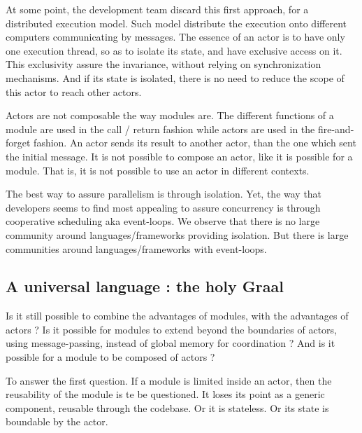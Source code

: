 At some point, the development team discard this first approach, for a distributed execution model.
Such model distribute the execution onto different computers communicating by messages.
The essence of an actor is to have only one execution thread, so as to isolate its state, and have exclusive access on it.
This exclusivity assure the invariance, without relying on synchronization mechanisms.
And if its state is isolated, there is no need to reduce the scope of this actor to reach other actors.

Actors are not composable the way modules are.
The different functions of a module are used in the call / return fashion while actors are used in the fire-and-forget fashion.
An actor sends its result to another actor, than the one which sent the initial message.
It is not possible to compose an actor, like it is possible for a module.
That is, it is not possible to use an actor in different contexts.


The best way to assure parallelism is through isolation.
Yet, the way that developers seems to find most appealing to assure concurrency is through cooperative scheduling aka event-loops.
We observe that there is no large community around languages/frameworks providing isolation.
But there is large communities around languages/frameworks with event-loops.

\subsection{A universal language : the holy Graal}


Is it still possible to combine the advantages of modules, with the advantages of actors ?
Is it possible for modules to extend beyond the boundaries of actors, using message-passing, instead of global memory for coordination ?
And is it possible for a module to be composed of actors ?

To answer the first question.
If a module is limited inside an actor, then the reusability of the module is te be questioned.
It loses its point as a generic component, reusable through the codebase.
Or it is stateless.
Or its state is boundable by the actor.

